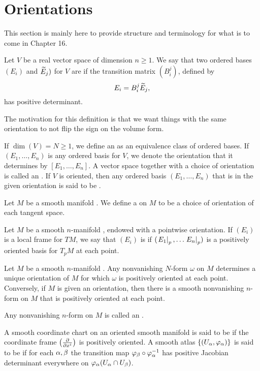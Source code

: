 \newpage\setcounter{section}{14}
\section{Orientations}

This section is mainly here to provide structure and terminology for what is to come in Chapter 16.

\dfn Let $V$  be a real vector space of dimension $n\geq 1$. We say that two ordered bases $(E_i)$ and $\widetilde E_j)$ for $V$ are  if the transition matrix $(B^j_i)$, defined by 
\[E_i = B^j_i \widetilde E_j,\]
has positive determinant.

\nb The motivation for this definition is that we want things with the same orientation to not flip the sign on the volume form.

\dfn If $\dim(V) = N\geq 1$, we define an  as an equivalence class of ordered bases. If $(E_1,\ldots,E_n)$ is any ordered basis for $V$, we denote the orientation that it determines by $[E_1,\ldots,E_n]$. A vector space together with a choice of orientation is called an . If $V$ is oriented, then any ordered basis $(E_1,\ldots,E_n)$ that is in the given orientation is said to be .

\dfn Let $M$ be a smooth manifold \wowob. We define a  on $M$ to be a choice of orientation of each tangent space.

\dfn Let $M$ be a smooth $n$-manifold \wowob, endowed with a pointwise orientation. If $(E_i)$ is a local frame for $TM$, we say that $(E_i)$ is  if $(\left. E_1\right|_{p},\ldots\left. E_n\right|_{p})$ is a positively oriented basis for $T_pM$ at each point.

\setcounter{thm}{4}

\begin{prop}
Let $M$ be a smooth $n$-manifold \wowob. Any nonvanishing $N$-form $\omega$ on $M$ determines a unique orientation of $M$ for which $\omega$ is positively oriented at each point. Conversely, if $M$ is given an orientation, then there is a smooth nonvanishing $n$-form on $M$ that is positively oriented at each point.
\end{prop}


\dfn Any nonvanishing $n$-form on $M$ is called an .

\dfn A smooth coordinate chart on an oriented smooth manifold \wowob is said to be  if the coordinate frame $\left(\frac{\partial}{\partial x^i}\right)$ is positively oriented. A smooth atlas $\{(U_\alpha, \varphi_\alpha)\}$ is said to be  if for each $\alpha,\beta$ the transition map $\varphi_\beta\circ\varphi_\alpha^{-1}$ has positive Jacobian determinant everywhere on $\varphi_\alpha(U_\alpha\cap U_\beta)$.


